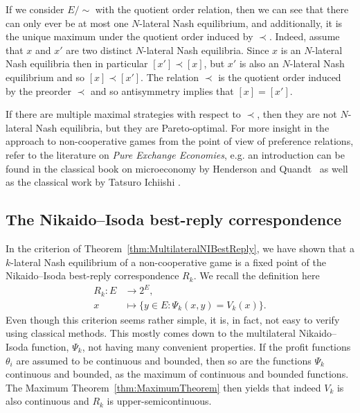 \documentclass[a4paper,11pt,reqno,english]{amsart}
\theoremstyle{plain}
\theoremstyle{definition}
\begin{document}
\medskip
If we consider $E/\sim$ with the quotient order relation, then we can see that there can only ever be at most one $N$-lateral Nash equilibrium, and additionally, it is the unique maximum under the quotient order induced by $\prec$.
Indeed, assume that $x$ and $x'$ are two distinct $N$-lateral Nash equilibria.
Since $x$ is an $N$-lateral Nash equilibria then in particular $[x']\prec [x]$, but $x'$ is also an $N$-lateral Nash equilibrium and so $[x]\prec [x']$.
The relation $\prec$ is the quotient order induced by the preorder $\prec$ and so antisymmetry implies that $[x]= [x']$.

\medskip
If there are multiple maximal strategies with respect to $\prec$, then they are not $N$-lateral Nash equilibria, but they are Pareto-optimal. For more insight in the approach to non-cooperative games from the point of view of preference relations, refer to the literature on \textit{Pure Exchange Economies}, e.g. an introduction can be found in the classical book on microeconomy by Henderson and Quandt~\cite{HendersonQuandt1958} as well as the classical work by Tatsuro Ichiishi \cite{Ichiishi_1983}.


\subsection{The Nikaido--Isoda best-reply correspondence}

In the criterion of Theorem~\ref{thm:MultilateralNIBestReply}, we have shown that a $k$-lateral Nash equilibrium of a non-cooperative game is a fixed point of the Nikaido--Isoda best-reply correspondence $R_k$. We recall the definition here
\begin{align*}
	R_k\colon E & \longrightarrow 2^{E} ,                      \\
	x           & \longmapsto \{y\in E : \Psi_k(x,y)=V_k(x)\}.
\end{align*}
Even though this criterion seems rather simple, it is, in fact, not easy to verify using classical methods.
This mostly comes down to the multilateral Nikaido--Isoda function, $\Psi_k$, not having many convenient properties.
If the profit functions $\theta_i$ are assumed to be continuous and bounded, then so are the functions $\Psi_k$ continuous and bounded, as the maximum of continuous and bounded functions.
The Maximum Theorem~\ref{thm:MaximumTheorem} then yields that indeed $V_k$ is also continuous and $R_k$ is upper-semicontinuous.
\end{document}
